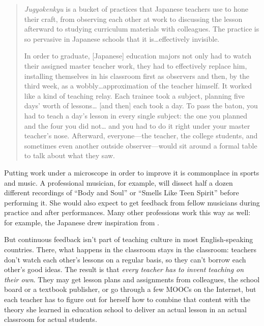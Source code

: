 \begin{quote}

\emph{Jugyokenkyu} is a bucket of practices that Japanese teachers use to
hone their craft, from observing each other at work to discussing the
lesson afterward to studying curriculum materials with colleagues. The
practice is so pervasive in Japanese schools that it
is{\ldots}effectively invisible.

In order to graduate, {[}Japanese{]} education majors not only had to
watch their assigned master teacher work, they had to effectively
replace him, installing themselves in his classroom first as
observers and then, by the third week, as a wobbly{\ldots}approximation
of the teacher himself. It worked like a kind of teaching
relay. Each trainee took a subject, planning five days' worth of
lessons{\ldots} {[}and then{]} each took a day. To pass the baton, you had to
teach a day's lesson in every single subject: the one you planned
and the four you did not{\ldots} and you had to do it right under your
master teacher's nose. Afterward, everyone---the teacher, the
college students, and sometimes even another outside
observer---would sit around a formal table to talk about what they
saw.

\end{quote}

Putting work under a microscope in order to improve it is commonplace
in sports and music. A professional musician, for example, will
dissect half a dozen different recordings of ``Body and Soul'' or
``Smells Like Teen Spirit'' before performing it. She would also expect
to get feedback from fellow musicians during practice and after
performances. Many other professions work this way as well: for
example, the Japanese drew inspiration from .

But continuous feedback isn't part of teaching culture in most
English-speaking countries. There, what happens in the classroom stays
in the classroom: teachers don't watch each other's lessons on a
regular basis, so they can't borrow each other's good ideas. The
result is that \emph{every teacher has to invent teaching on their
own}. They may get lesson plans and assignments from colleagues, the
school board or a textbook publisher, or go through a few MOOCs on the
Internet, but each teacher has to figure out for herself how to
combine that content with the theory she learned in education school
to deliver an actual lesson in an actual classroom for actual
students.

